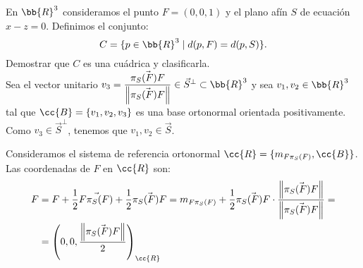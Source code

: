 \documentclass[12pt]{article}
\begin{document}
   \begin{ejercicio}[2.5 puntos]
    En $\bb{R}^3$ consideramos el punto $F = (0, 0, 1)$ y el plano afín $S$ de ecuación $x-z = 0$. Definimos el conjunto:
    \begin{equation*}
        C = \{p \in \bb{R}^3 \mid d(p, F) = d(p, S)\}.
    \end{equation*}
    Demostrar que $C$ es una cuádrica y clasificarla.\\


    Sea el vector unitario $v_3=\dfrac{\vec{\pi_S(F)F}}{\left\|\vec{\pi_S(F)F}\right\|}\in \vec{S}^\perp \subset \bb{R}^3$
    y sea $v_1,v_2\in \bb{R}^3$ tal que $\cc{B}=\{v_1,v_2,v_3\}$ es una base ortonormal orientada positivamente.
    Como $v_3\in \vec{S}^\perp$, tenemos que $v_1,v_2\in \vec{S}$.

    Consideramos el sistema de referencia ortonormal $\cc{R}=\{m_{F\pi_S(F)},\cc{B}\}$. Las coordenadas de $F$ en $\cc{R}$ son:
    \begin{align*}
        F &= F + \frac{1}{2}\vec{F\pi_S(F)} + \frac{1}{2}\vec{\pi_S(F)F} 
        = m_{F \pi_S(F)} + \frac{1}{2}\vec{\pi_S(F)F} \cdot \dfrac{\left\|\vec{\pi_S(F)F}\right\|}{\left\|\vec{\pi_S(F)F}\right\|}
        =\\&= \left(0,0, \dfrac{\left\|\vec{\pi_S(F)F}\right\|}{2}\right)_{\cc{R}}
    \end{align*}


\end{ejercicio}
\end{document}
